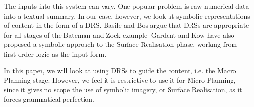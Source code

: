 The inputs into this system can vary. One popular problem is raw numerical data into a textual summary. In our case, however, we look at symbolic representations of content in the form of a DRS. Basile and Bos argue that DRSs are appropriate for all stages of the Bateman and Zock example\cite{basile2011towards}. Gardent and Kow have also proposed a symbolic approach to the Surface Realisation phase, working from first-order logic as the input form\cite{gardent2007symbolic}.

In this paper, we will look at using DRSs to guide the content, i.e. the Macro Planning stage. However, we feel it is restrictive to use it for Micro Planning, since it gives no scope the use of symbolic imagery, or Surface Realisation, as it forces grammatical perfection.





